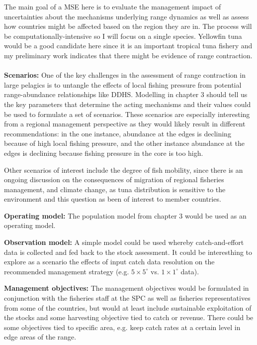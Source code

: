 \documentclass{article}
\newcommand{\griddef}[2]{$#1 \times #2^\circ$}
\begin{document}
The main goal of a MSE here is to evaluate the management impact of uncertainties
about the mechanisms underlying range dynamics as well as assess how
countries might be affected based on the region they are in. The
process will be computationally-intensive so I will focus on a
single species. Yellowfin tuna would be a good candidate here since it
is an important tropical tuna fishery and my preliminary work
indicates that there might be evidence of range contraction.\\
\\
\noindent\textbf{Scenarios:} One of the key challenges in the assessment of
range contraction in large pelagics is to untangle the effects of
local fishing pressure from potential range-abundance relationships
like DDHS. Modelling in chapter 3 should tell us the key parameters
that determine the acting mechanisms and their values
could be used to formulate a set of scenarios. These scenarios are
especially interesting from a regional management perspective as they
would likely result in different recommendations: in the one
instance, abundance at the edges is declining because of high local
fishing pressure, and the other instance abundance at the edges is declining
because fishing pressure in the core is too high.

Other scenarios of interest include the degree of fish mobility, since
there is an ongoing discussion on the consequences of migration of
regional fisheries management, and climate change, as tuna
distribution is sensitive to the environment and this question as been
of interest to member countries.

\noindent\textbf{Operating model:} The population model from chapter 3 would be
used as an operating model.

\noindent\textbf{Observation model:} A simple model could be used whereby
catch-and-effort data is collected and fed back to the stock
assessment. It could be interesthing to explore as a scenario the
effects of input catch data resolution on the recommended
management strategy (e.g. \griddef{5}{5} vs. \griddef{1}{1}
data).

\noindent\textbf{Management objectives:} The management objectives
would be formulated in conjunction with the fisheries staff at the SPC
as well as fisheries representatives from some of the countries, but
would at least include sustainable exploitation of the stocks and some
harvesting objective tied to catch or revenue. There could be some
objectives tied to specific area, e.g. keep catch rates at a certain level
 in edge areas of the range.
\end{document}
